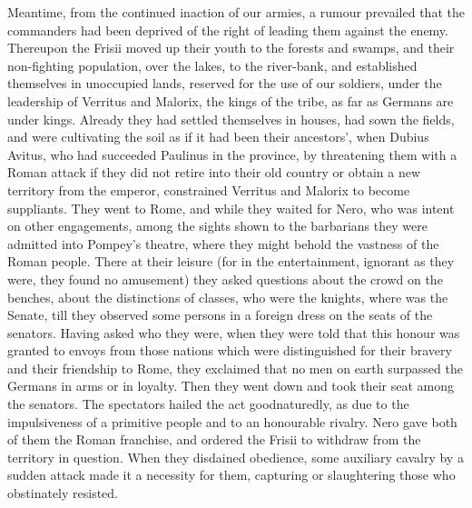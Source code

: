 
Meantime, from the continued inaction of our armies, a rumour prevailed that the commanders had been deprived of the right of leading them against the enemy. Thereupon the Frisii moved up their youth to the forests and swamps, and their non-fighting population, over the lakes, to the river-bank, and established themselves in unoccupied lands, reserved for the use of our soldiers, under the leadership of Verritus and Malorix, the kings of the tribe, as far as Germans are under kings. Already they had settled themselves in houses, had sown the fields, and were cultivating the soil as if it had been their ancestors', when Dubius Avitus, who had succeeded Paulinus in the province, by threatening them with a Roman attack if they did not retire into their old country or obtain a new territory from the emperor, constrained Verritus and Malorix to become suppliants. They went to Rome, and while they waited for Nero, who was intent on other engagements, among the sights shown to the barbarians they were admitted into Pompey's theatre, where they might behold the vastness of the Roman people. There at their leisure (for in the entertainment, ignorant as they were, they found no amusement) they asked questions about the crowd on the benches, about the distinctions of classes, who were the knights, where was the Senate, till they observed some persons in a foreign dress on the seats of the senators. Having asked who they were, when they were told that this honour was granted to envoys from those nations which were distinguished for their bravery and their friendship to Rome, they exclaimed that no men on earth surpassed the Germans in arms or in loyalty. Then they went down and took their seat among the senators. The spectators hailed the act goodnaturedly, as due to the impulsiveness of a primitive people and to an honourable rivalry. Nero gave both of them the Roman franchise, and ordered the Frisii to withdraw from the territory in question. When they disdained obedience, some auxiliary cavalry by a sudden attack made it a necessity for them, capturing or slaughtering those who obstinately resisted.


